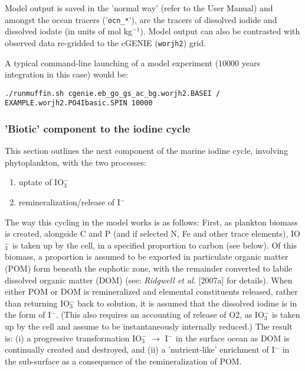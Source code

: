 \documentclass[11pt,fleqn]{book} %
\begin{document}
Model output is saved in the 'normal way' (refer to the User Manual) and amongst the ocean tracers ('\texttt{ocn\_*}'), are the tracers of dissolved iodide and dissolved iodate (in units of mol kg\(^{-1}\)). Model output can also be contrasted with observed data re-gridded to the cGENIE (\texttt{worjh2}) grid.

\noindent A typical command-line launching of a model experiment (10000 years integration in this case) would be:
\vspace{-1mm}\begin{verbatim}./runmuffin.sh cgenie.eb_go_gs_ac_bg.worjh2.BASEI /
EXAMPLE.worjh2.PO4Ibasic.SPIN 10000\end{verbatim}\vspace{-1mm}

%
\subsubsection{'Biotic' component to the iodine cycle}
\vspace{1mm}

This section outlines the next component of the marine iodine cycle, involving phytoplankton, with the two processes:
\begin{enumerate}[noitemsep]
\vspace{1mm}
\item uptate of IO\(^{-}_{3}\)
\vspace{1mm}
\item  remineralization/release of I\(^{-}\)
\end{enumerate}

\noindent The way this cycling in the model works is as follows: First, as plankton biomass is created, alongside C and P (and if selected N, Fe and other trace elements), IO\(^{-}_{3}\) is taken up by the cell, in a specified proportion to carbon (see below). Of this biomass, a proportion is assumed to be exported in particulate organic matter (POM) form beneath the euphotic zone, with the remainder converted to labile dissolved organic matter (DOM) (see: \textit{Ridgwell et al.} [2007a] for details). When either POM or DOM is remineralized and elemental constituents released, rather than returning IO\(^{-}_{3}\) back to solution, it is assumed that the dissolved iodine is in the form of I\(^{-}\). (This also requires an accounting of release of O2, as IO\(^{-}_{3}\) is taken up by the cell and assume to be instantaneously internally reduced.) The result is: (i) a progressive transformation IO\(^{-}_{3}\) \(\rightarrow\) I\(^{-}\) in the surface ocean as DOM is continually created and destroyed, and (ii) a 'nutrient-like' enrichment of I\(^{-}\) in the sub-surface as a consequence of the remineralization of POM.
\end{document}
